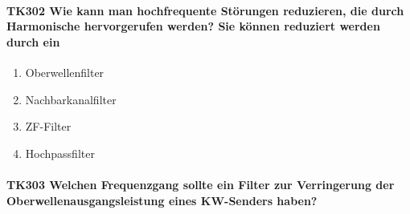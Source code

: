 \documentclass[8pt]{article}
\begin{document}
\paragraph*{TK302 Wie kann man hochfrequente Störungen reduzieren, die durch Harmonische hervorgerufen werden? Sie können reduziert werden durch ein}
\begin{enumerate}[nolistsep,label=\Alph*]
\item Oberwellenfilter
\item Nachbarkanalfilter
\item ZF-Filter
\item Hochpassfilter
\end{enumerate}

\paragraph*{TK303 Welchen Frequenzgang sollte ein Filter zur Verringerung der Oberwellenausgangsleistung eines KW-Senders haben?}
\end{document}
